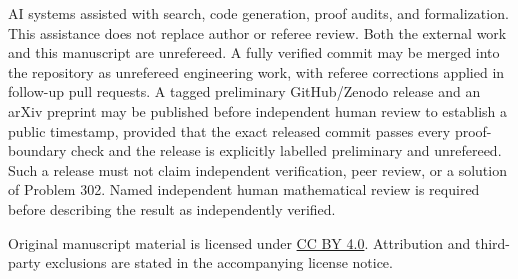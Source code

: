 \documentclass[11pt]{article}
\theoremstyle{definition}
\theoremstyle{plain}
\begin{document}
AI systems assisted with search, code generation, proof audits, and
formalization.  This assistance does not replace author or referee review.
Both the external work and this manuscript are unrefereed.  A fully verified
commit may be merged into the repository as unrefereed engineering work, with
referee corrections applied in follow-up pull requests.  A tagged preliminary
GitHub/Zenodo release and an arXiv preprint may be published before independent
human review to establish a public timestamp, provided that the exact released
commit passes every proof-boundary check and the release is explicitly labelled
preliminary and unrefereed.  Such a release must not claim independent
verification, peer review, or a solution of Problem 302.  Named independent
human mathematical review is required before describing the result as
independently verified.

Original manuscript material is licensed under
\href{https://creativecommons.org/licenses/by/4.0/}{CC BY 4.0}.  Attribution
and third-party exclusions are stated in the accompanying license notice.



\end{document}

